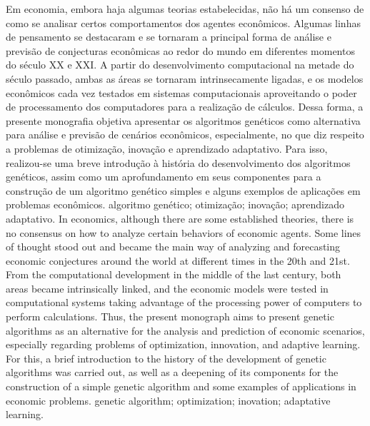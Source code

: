 \resumo
{Em economia, embora haja algumas teorias estabelecidas, não há um consenso de como se analisar certos comportamentos dos agentes econômicos. Algumas linhas de pensamento se destacaram e se tornaram a principal forma de análise e previsão de conjecturas econômicas ao redor do mundo em diferentes momentos do século XX e XXI. A partir do desenvolvimento computacional na metade do século passado, ambas as áreas se tornaram intrinsecamente ligadas, e os modelos econômicos cada vez testados em sistemas computacionais aproveitando o poder de processamento dos computadores para a realização de cálculos. Dessa forma, a presente monografia objetiva apresentar os algoritmos genéticos como alternativa para análise e previsão de cenários econômicos, especialmente, no que diz respeito a problemas de otimização, inovação e aprendizado adaptativo. Para isso, realizou-se uma breve introdução à história do desenvolvimento dos algoritmos genéticos, assim como um aprofundamento em seus componentes para a construção de um algoritmo genético simples e alguns exemplos de aplicações em problemas econômicos.}
{algoritmo genético; otimização; inovação; aprendizado adaptativo.}
{In economics, although there are some established theories, there is no consensus on how to analyze certain behaviors of economic agents. Some lines of thought stood out and became the main way of analyzing and forecasting economic conjectures around the world at different times in the 20th and 21st. From the computational development in the middle of the last century, both areas became intrinsically linked, and the economic models were tested in computational systems taking advantage of the processing power of computers to perform calculations. Thus, the present monograph aims to present genetic algorithms as an alternative for the analysis and prediction of economic scenarios, especially regarding problems of optimization, innovation, and adaptive learning. For this, a brief introduction to the history of the development of genetic algorithms was carried out, as well as a deepening of its components for the construction of a simple genetic algorithm and some examples of applications in economic problems.}
{genetic algorithm; optimization; inovation; adaptative learning.}

\listafiguras
 
